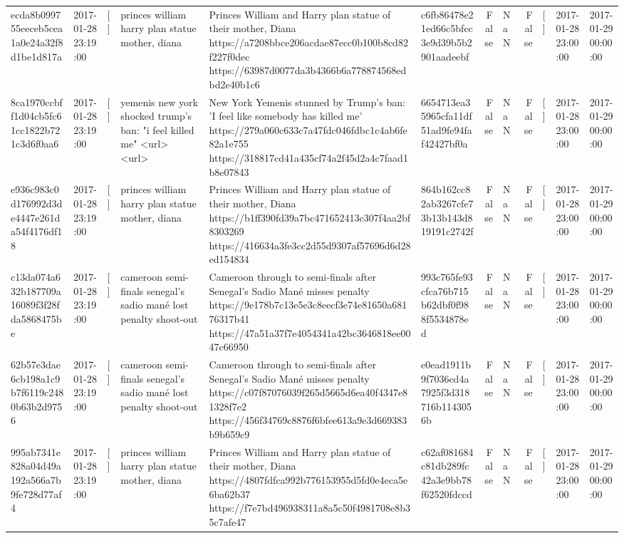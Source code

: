 \begin{tabular}{llllllrlrlll}
ecda8b099755eeceb5cea1a0e24a32f8d1be1d817a & 2017-01-28 23:19:00 & [] & princes william harry plan statue mother, diana & Princes William and Harry plan statue of their mother, Diana https://a7208bbce206acdae87ecc0b100b8cd82f227f0dec https://63987d0077da3b4366b6a778874568edbd2e40b1c6 & c6fb86478e21ed66c5bfcc3e9d39b5b2901aadeebf & False & NaN & False & [] & 2017-01-28 23:00:00 & 2017-01-29 00:00:00 \\
8ca1970ccbff1d04cb5fc61cc1822b721c3d6f0aa6 & 2017-01-28 23:19:00 & [] & yemenis new york shocked trump's ban: "i feel killed me" <url> <url> & New York Yemenis stunned by Trump's ban: 'I feel like somebody has killed me' https://279a060c633c7a47fdc046fdbc1c4ab6fe82a1e755 https://318817cd41a435cf74a2f45d2a4c7faad1b8e07843 & 6654713ea35965cfa11df51ad9fe94faf42427bf0a & False & NaN & False & [] & 2017-01-28 23:00:00 & 2017-01-29 00:00:00 \\
e936c983c0d176992d3de4447e261da54f4176df18 & 2017-01-28 23:19:00 & [] & princes william harry plan statue mother, diana & Princes William and Harry plan statue of their mother, Diana https://b1ff390fd39a7bc471652413c307f4aa2bf8303269 https://416634a3fe3cc2d55d9307af57696d6d28ed154834 & 864b162cc82ab3267cfe73b13b143d819191c2742f & False & NaN & False & [] & 2017-01-28 23:00:00 & 2017-01-29 00:00:00 \\
c13da074a632b187709a16089f3f28fda5868475be & 2017-01-28 23:19:00 & [] & cameroon semi-finals senegal's sadio mané lost penalty shoot-out & Cameroon through to semi-finals after Senegal’s Sadio Mané misses penalty https://9e178b7c13e5e3c8eecf3e74e81650a68176317b41 https://47a51a37f7e4054341a42bc3646818ee0047c66950 & 993c765fe93cfca76b715b62dbf0f988f5534878ed & False & NaN & False & [] & 2017-01-28 23:00:00 & 2017-01-29 00:00:00 \\
62b57e3dae6cb198a1c9b7f6119c2480b63b2d9756 & 2017-01-28 23:19:00 & [] & cameroon semi-finals senegal's sadio mané lost penalty shoot-out & Cameroon through to semi-finals after Senegal’s Sadio Mané misses penalty https://c07f87076039f265d5665d6ea40f4347e81328f7e2 https://456f34769c8876f6bfee613a9e3d669383b9b659c9 & e0ead1911b9f7036cd4a7925f3d318716b1143056b & False & NaN & False & [] & 2017-01-28 23:00:00 & 2017-01-29 00:00:00 \\
995ab7341e828a04d49a192a566a7b9fe728d77af4 & 2017-01-28 23:19:00 & [] & princes william harry plan statue mother, diana & Princes William and Harry plan statue of their mother, Diana https://4807fdfca992b776153955d5fd0e4eca5e6ba62b37 https://f7e7bd496938311a8a5c50f4981708e8b35c7afe47 & c62af081684c81db289fc42a3e9bb78f62520fdccd & False & NaN & False & [] & 2017-01-28 23:00:00 & 2017-01-29 00:00:00 \\

\end{tabular}
